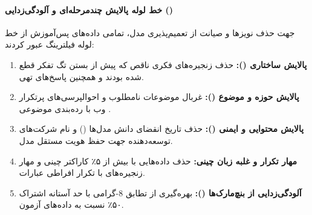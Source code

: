 \paragraph*{خط لوله پالایش چندمرحله‌ای و آلودگی‌زدایی ()}
جهت حذف نویزها و صیانت از تعمیم‌پذیری مدل، تمامی داده‌های پس‌آموزش از خط لوله فیلترینگ عبور کردند:
\begin{enumerate}
    \item \textbf{پالایش ساختاری ():} حذف زنجیره‌های فکری ناقص که پیش از بستن تگ تفکر قطع شده بودند و همچنین پاسخ‌های تهی.
    \item \textbf{پالایش حوزه و موضوع ():} غربال موضوعات نامطلوب و احوالپرسی‌های پرتکرار وب با رده‌بندی موضوعی .
    \item \textbf{پالایش محتوایی و ایمنی ():} حذف تاریخ انقضای دانش مدل‌ها () و نام شرکت‌های توسعه‌دهنده جهت حفظ هویت مستقل مدل.
    \item \textbf{مهار تکرار و غلبه زبان چینی:} حذف داده‌هایی با بیش از ۵٪ کاراکتر چینی و مهار زنجیره‌های با تکرار افراطی عبارات.
    \item \textbf{آلودگی‌زدایی از بنچ‌مارک‌ها ():} بهره‌گیری از تطابق $8$-گرامی با حد آستانه اشتراک ۵۰٪ نسبت به داده‌های آزمون.
\end{enumerate}

